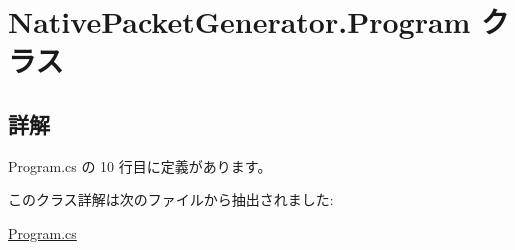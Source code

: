 \hypertarget{classNativePacketGenerator_1_1Program}{}\section{Native\+Packet\+Generator.\+Program クラス}
\label{classNativePacketGenerator_1_1Program}


\subsection{詳解}


 Program.\+cs の 10 行目に定義があります。



このクラス詳解は次のファイルから抽出されました\+:\begin{DoxyCompactItemize}
\item 
\mbox{\hyperlink{Program_8cs}{Program.\+cs}}\end{DoxyCompactItemize}
